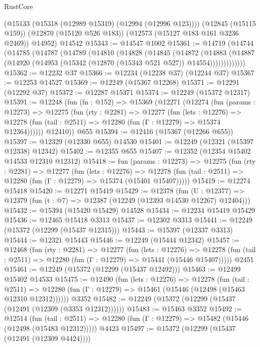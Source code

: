 \begin{lexlean}{RustCore}
\begin{coremodule}
      (@15133 (@15318 (@12989 @15319) (@12994 (@12996 @123))))
      (@12845 (@15115 @159))
      (@12870 (@15120 @526 @183))
      (@12573 (@15127 @183 @161 @3236 @2469))
      @14952)
    @14542
@15343 := @14547 @1002
@15361 := @14719
    (@14744
      (@14785
        (@14787
          (@14789
            (@14810
              (@14828
                (@14845
                  (@14872
                    (@14883
                      (@14887
                        (@14920 (@14953 (@15342 (@12870 (@15343 @521 @527)) @14554)))))))))))))
@15362 := @12232 @37
@15366 := @12234 (@12238 @37) (@12244 @37)
@15367 := @12253 @14527
@15369 := @12249 (@15367 @12268)
@15371 := @12291 (@12292 @37)
@15372 := @12287 @15371
@15374 := @12249 (@15372 @12317)
@15391 := @12248
    (fun (fn : @152) =>
    @15369
      (@12271
        (@12274
          (fun (params : @12273) =>
          @12275
            (fun (rty : @2281) =>
            @12277
              (fun (lets : @12276) =>
              @12278 (fun (tail : @2511) => @12280 (fun (Γ : @12279) => @15374 @12364))))))
        @12410))
    @655
@15394 := @12416 (@15367 (@12266 @655))
@15397 := @12329 (@12330 @655) @14530
@15401 := @12249 (@12321 (@15397 @12338) @12342)
@15402 := @12355 @655
@15407 := @12352 (@12354 @15402 @14533 @12310 @12312)
@15418 := fun (params : @12273) =>
  @12275
    (fun (rty : @2281) =>
    @12277
      (fun (lets : @12276) =>
      @12278 (fun (tail : @2511) => @12280 (fun (Γ : @12279) => @15374 (@15401 @15407)))))
@15419 := @12274 @15418
@15420 := @12271 @15419
@15429 := @12378
    (fun (U : @12377) => @12379 (fun (t : @7) => @12387 (@12249 (@12393 @14530 @12267) @12404)))
@15432 := @15394 (@15420 @15429) @14528
@15434 := @12234 @15419 @15429
@15436 := @12465 @15418 @3313
@15437 := @12302 @3313
@15441 := @12249 (@15372 (@12299 (@15437 @12315)))
@15443 := @15397 (@12337 @3313)
@15444 := @12321 @15443
@15446 := @12249 (@15444 @12342)
@15457 := @12468
    (fun (rty : @2281) =>
    @12277
      (fun (lets : @12276) =>
      @12278 (fun (tail : @2511) => @12280 (fun (Γ : @12279) => @15441 (@15446 @15407)))))
    @2451
@15461 := @12249 (@15372 (@12299 (@15437 @12492)))
@15463 := @12499 @15402 @14533
@15475 := @12490
    (fun (lets : @12276) =>
    @12278
      (fun (tail : @2511) =>
      @12280 (fun (Γ : @12279) => @15461 (@15446 (@12498 (@15463 @12310 @12312))))))
    @3352
@15482 := @12249 (@15372 (@12299 (@15437 (@12491 (@12309 (@3353 @12312))))))
@15483 := @15463 @3352
@15492 := @12514
    (fun (tail : @2511) => @12280 (fun (Γ : @12279) => @15482 (@15446 (@12498 (@15483 @12312)))))
    @4423
@15497 := @15372 (@12299 (@15437 (@12491 (@12309 @4424))))

\end{coremodule}
\end{lexlean}
